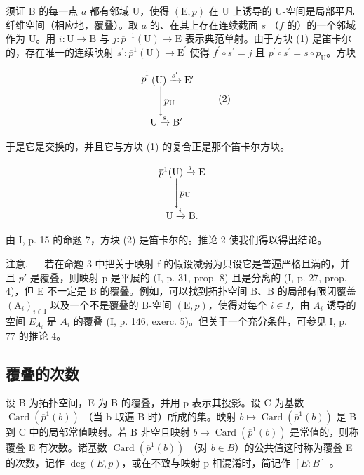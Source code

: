 须证 B 的每一点 \(a\) 都有邻域 U，使得 \((\mathrm{E}, p)\) 在 U 上诱导的 U-空间是局部平凡纤维空间（相应地，覆叠）。取 \(a\) 的、在其上存在连续截面 \(s\) （\(f\) 的）的一个邻域作为 U。用 \(i: \mathrm{U} \to \mathrm{B}\) 与 \(j: \overline{p}^{-1}(\mathrm{U}) \to \mathrm{E}\) 表示典范单射。由于方块 (1) 是笛卡尔的，存在唯一的连续映射 \(s^{\prime}\colon \overline{p}^{1}(\mathrm{U})\to \mathrm{E}^{\prime}\) 使得 \(f^{\prime}\circ s^{\prime} = j\) 且 \(p^{\prime}\circ s^{\prime} = s\circ p_{\mathrm{U}}\)。方块

\[
\begin{array}{c} \stackrel {{- 1}} {{p}} (\mathrm{U}) \xrightarrow {s ^ {\prime}} \mathrm{E} ^ {\prime} \\ \Biggl \downarrow p _ {\mathrm{U}} \\ \mathrm{U} \xrightarrow {s} \mathrm{B} ^ {\prime} \end{array}\tag{2}
\]

于是它是交换的，并且它与方块 (1) 的复合正是那个笛卡尔方块。

\[
\begin{array}{c} \overline {{p}} ^ {1} (\mathrm{U}) \xrightarrow {j} \mathrm{E} \\ \Biggl \downarrow p _ {\mathrm{U}} \\ \mathrm{U} \xrightarrow {i} \mathrm{B}. \end{array}
\]

由 I, p. 15 的命题 7，方块 (2) 是笛卡尔的。推论 2 使我们得以得出结论。

注意. --- 若在命题 3 中把关于映射 f 的假设减弱为只设它是普遍严格且满的，并且 \(p'\) 是覆叠，则映射 p 是平展的 (I, p. 31, prop. 8) 且是分离的 (I, p. 27, prop. 4)，但 E 不一定是 B 的覆叠。例如，可以找到拓扑空间 B、B 的局部有限闭覆盖 \((\mathrm{A}_{i})_{i\in\mathrm{I}}\) 以及一个不是覆叠的 B-空间 \((\mathrm{E},p)\)，使得对每个 \(i\in I\)，由 \(A_{i}\) 诱导的空间 \(E_{A_{i}}\) 是 \(A_{i}\) 的覆叠 (I, p. 146, exerc. 5)。但关于一个充分条件，可参见 I, p. 77 的推论 4。

\subsection{覆叠的次数}

设 B 为拓扑空间，E 为 B 的覆叠，并用 p 表示其投影。设 C 为基数 \(\operatorname{Card}(\overline{p}^{1}(b))\) （当 b 取遍 B 时）所成的集。映射 \(b \mapsto \operatorname{Card}(\overline{p}^{1}(b))\) 是 B 到 C 中的局部常值映射。若 B 非空且映射 \(b \mapsto \operatorname{Card}(\overline{p}^{1}(b))\) 是常值的，则称覆叠 E 有次数。诸基数 \(\operatorname{Card}(\overline{p}^{1}(b))\) （对 \(b \in B\)）的公共值这时称为覆叠 E 的次数，记作 \(\deg(E, p)\)，或在不致与映射 p 相混淆时，简记作 \([E:B]\) 。

